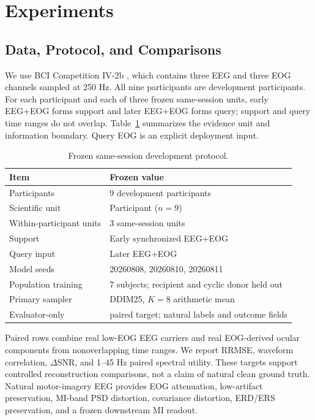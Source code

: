 \section{Experiments}
\label{sec:experiments}

\subsection{Data, Protocol, and Comparisons}
We use BCI Competition IV-2b \cite{tangermann2012bciciv}, which contains three EEG and three EOG channels
sampled at 250 Hz. All nine participants are development participants. For each
participant and each of three frozen same-session units, early EEG+EOG forms
support and later EEG+EOG forms query; support and query time ranges do not
overlap. Table~\ref{tab:protocol} summarizes the evidence unit and information
boundary. Query EOG is an explicit deployment input.

\begin{table}[t]
\caption{Frozen same-session development protocol.}
\label{tab:protocol}
\centering
\begin{tabular}{ll}
\toprule
Item & Frozen value\\
\midrule
Participants & 9 development participants\\
Scientific unit & Participant ($n=9$)\\
Within-participant units & 3 same-session units\\
Support & Early synchronized EEG+EOG\\
Query input & Later EEG+EOG\\
Model seeds & 20260808, 20260810, 20260811\\
Population training & 7 subjects; recipient and cyclic donor held out\\
Primary sampler & DDIM25, $K=8$ arithmetic mean\\
Evaluator-only & paired target; natural labels and outcome fields\\
\bottomrule
\end{tabular}
\end{table}

Paired rows combine real low-EOG EEG carriers and real EOG-derived ocular
components from nonoverlapping time ranges. We report RRMSE, waveform
correlation, $\Delta$SNR, and 1--45 Hz paired spectral utility. These targets
support controlled reconstruction comparisons, not a claim of natural clean
ground truth. Natural motor-imagery EEG provides EOG attenuation,
low-artifact preservation, MI-band PSD distortion, covariance distortion,
ERD/ERS preservation, and a frozen downstream MI readout.

